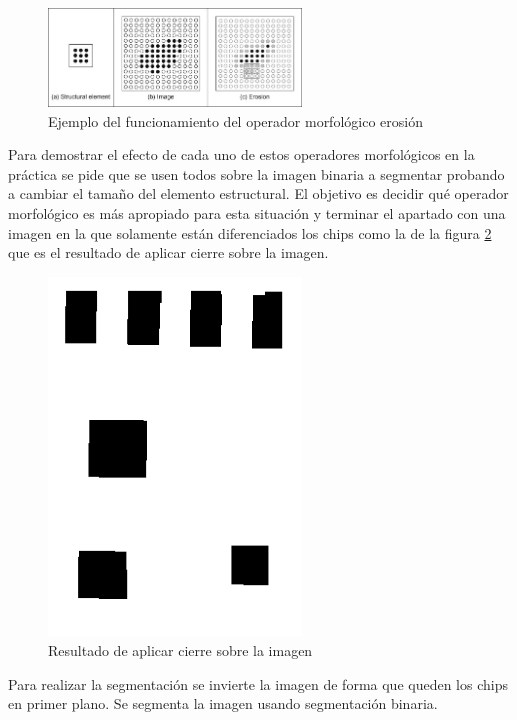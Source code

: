 \documentclass[a4paper,12pt]{report}
\begin{document}
\begin{figure}[h]
\centering
\includegraphics[width=0.6\textwidth]{imagenes/erosion}
\caption{Ejemplo del funcionamiento del operador morfológico erosión}
\label{erosion}
\end{figure}

Para demostrar el efecto de cada uno de estos operadores morfológicos en la práctica se pide que se usen todos sobre la imagen binaria a segmentar probando a cambiar el tamaño del elemento estructural. El objetivo es decidir qué operador morfológico es más apropiado para esta situación y terminar el apartado con una imagen en la que solamente están diferenciados los chips como la de la figura \ref{closing} que es el resultado de aplicar cierre sobre la imagen.\\

\begin{figure}[h]
\centering
\includegraphics[width=0.6\textwidth]{imagenes/Closing}
\caption{Resultado de aplicar cierre sobre la imagen}
\label{closing} 
\end{figure}

Para realizar la segmentación se invierte la imagen de forma que queden los chips en primer plano. Se segmenta la imagen usando segmentación binaria.\\
\end{document}
